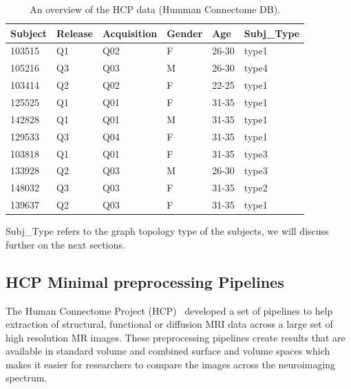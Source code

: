 \documentclass{article}
\begin{document}
\begin{table}[H]\hspace*{-1cm}
\centering
\begin{threeparttable}
\caption{An overview of the HCP data (Humman Connectome DB).}

\begin{tabular}{@{}llllll@{}}
\toprule
Subject & Release & Acquisition & Gender & Age      & Subj\_Type   \\ \midrule
103515  & Q1      & Q02         & F      & 26-30    & type1         \\
105216  & Q3      & Q03         & M      & 26-30    & type4         \\
103414  & Q2      & Q02         & F      & 22-25    & type1         \\
125525  & Q1      & Q01         & F      & 31-35    & type1         \\
142828  & Q1      & Q01         & M      & 31-35    & type1         \\
129533  & Q3      & Q04         & F      & 31-35    & type1         \\
103818  & Q1      & Q01         & F      & 31-35    & type3         \\
133928  & Q2      & Q03         & M      & 26-30    & type3         \\
148032  & Q3      & Q03         & F      & 31-35    & type2         \\
139637  & Q2      & Q03         & F      & 31-35    & type1         \\ \bottomrule
\end{tabular}
\begin{tablenotes}
      \small
      \item *Subj\_Type refers to the graph topology type of the subjects,
      we will discuss further on the next sections.
\end{tablenotes}
\end{threeparttable}
\label{table:data}
\end{table}


\subsection{HCP Minimal preprocessing Pipelines}

The Human Connectome Project (HCP)~\cite{Gla13} developed a set of
pipelines to help extraction of structural, functional or diffusion
MRI data across a large set of high resolution MR images. These
preprocessing pipelines create results that are available in standard
volume and combined surface and volume spaces which makes it easier
for researchers to compare the images across the neuroimaging
spectrum.
\end{document}
